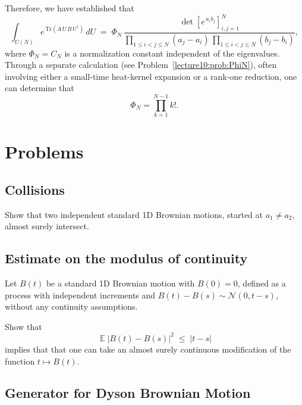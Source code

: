 \documentclass[letterpaper,11pt,oneside,reqno]{book}
\numberwithin{equation}{chapter}  %
\theoremstyle{definition}
\begin{document}
Therefore, we have established that
\[
   \int_{U(N)} e^{\,\mathrm{Tr}(A\,U\,B\,U^\dagger)}\,dU
   \;=\;
   \Phi_N
   \,\frac{\det[e^{\,a_i b_j}]_{i,j=1}^N}{\prod_{1\le i<j\le N}(a_j-a_i)\,\prod_{1\le i<j\le N}(b_j-b_i)},
\]
where $\Phi_N = C_N$ is a normalization constant independent
of the eigenvalues. Through a separate calculation
(see Problem~\ref{lecture10:prob:PhiN}), often
involving either a small-time heat-kernel expansion or a
rank-one reduction, one can determine that
\begin{equation}
	\label{lecture10:eq:PhiN}
   \Phi_N = \prod_{k=1}^{N-1} k!.
 \end{equation}














\section{Problems}

\subsection{Collisions}

Show that two independent standard 1D Brownian motions, started at $a_1\neq a_2$, almost surely intersect.

\subsection{Estimate on the modulus of continuity}

Let $B(t)$ be a standard 1D Brownian motion with $B(0)=0$,
defined as a process with independent increments and $B(t)-B(s)\sim \mathcal{N}(0,t-s)$,
without any continuity assumptions.

Show that
\begin{equation*}
	\operatorname{\mathbb{E}}|B(t)-B(s)|^2 \;\le\; |t-s|
\end{equation*}
implies that
that one can take an almost
surely continuous modification of the function $t\mapsto B(t)$.

\subsection{Generator for Dyson Brownian Motion}
\label{lecture10:prob:generator}
\end{document}
